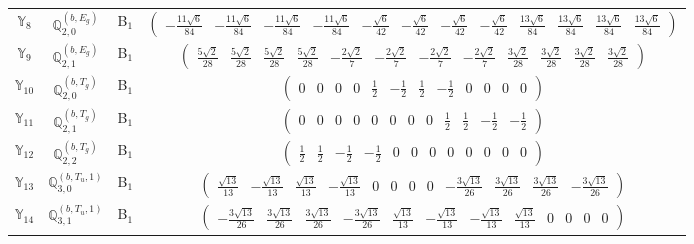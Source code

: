\documentclass[fleqn,10pt,landscape]{article}
\begin{document}
\begin{itemize}
\begin{center}
\begin{longtable}{c|c|c|c}
$ \mathbb{Y}_{8} $ & $\mathbb{Q}_{2,0}^{(b,E_{g})}$ & B$_{1}$ & $\begin{pmatrix} - \frac{11 \sqrt{6}}{84} & - \frac{11 \sqrt{6}}{84} & - \frac{11 \sqrt{6}}{84} & - \frac{11 \sqrt{6}}{84} & - \frac{\sqrt{6}}{42} & - \frac{\sqrt{6}}{42} & - \frac{\sqrt{6}}{42} & - \frac{\sqrt{6}}{42} & \frac{13 \sqrt{6}}{84} & \frac{13 \sqrt{6}}{84} & \frac{13 \sqrt{6}}{84} & \frac{13 \sqrt{6}}{84} \end{pmatrix}$ \\
$ \mathbb{Y}_{9} $ & $\mathbb{Q}_{2,1}^{(b,E_{g})}$ & B$_{1}$ & $\begin{pmatrix} \frac{5 \sqrt{2}}{28} & \frac{5 \sqrt{2}}{28} & \frac{5 \sqrt{2}}{28} & \frac{5 \sqrt{2}}{28} & - \frac{2 \sqrt{2}}{7} & - \frac{2 \sqrt{2}}{7} & - \frac{2 \sqrt{2}}{7} & - \frac{2 \sqrt{2}}{7} & \frac{3 \sqrt{2}}{28} & \frac{3 \sqrt{2}}{28} & \frac{3 \sqrt{2}}{28} & \frac{3 \sqrt{2}}{28} \end{pmatrix}$ \\
$ \mathbb{Y}_{10} $ & $\mathbb{Q}_{2,0}^{(b,T_{g})}$ & B$_{1}$ & $\begin{pmatrix} 0 & 0 & 0 & 0 & \frac{1}{2} & - \frac{1}{2} & \frac{1}{2} & - \frac{1}{2} & 0 & 0 & 0 & 0 \end{pmatrix}$ \\
$ \mathbb{Y}_{11} $ & $\mathbb{Q}_{2,1}^{(b,T_{g})}$ & B$_{1}$ & $\begin{pmatrix} 0 & 0 & 0 & 0 & 0 & 0 & 0 & 0 & \frac{1}{2} & \frac{1}{2} & - \frac{1}{2} & - \frac{1}{2} \end{pmatrix}$ \\
$ \mathbb{Y}_{12} $ & $\mathbb{Q}_{2,2}^{(b,T_{g})}$ & B$_{1}$ & $\begin{pmatrix} \frac{1}{2} & \frac{1}{2} & - \frac{1}{2} & - \frac{1}{2} & 0 & 0 & 0 & 0 & 0 & 0 & 0 & 0 \end{pmatrix}$ \\
$ \mathbb{Y}_{13} $ & $\mathbb{Q}_{3,0}^{(b,T_{u},1)}$ & B$_{1}$ & $\begin{pmatrix} \frac{\sqrt{13}}{13} & - \frac{\sqrt{13}}{13} & \frac{\sqrt{13}}{13} & - \frac{\sqrt{13}}{13} & 0 & 0 & 0 & 0 & - \frac{3 \sqrt{13}}{26} & \frac{3 \sqrt{13}}{26} & \frac{3 \sqrt{13}}{26} & - \frac{3 \sqrt{13}}{26} \end{pmatrix}$ \\
$ \mathbb{Y}_{14} $ & $\mathbb{Q}_{3,1}^{(b,T_{u},1)}$ & B$_{1}$ & $\begin{pmatrix} - \frac{3 \sqrt{13}}{26} & \frac{3 \sqrt{13}}{26} & \frac{3 \sqrt{13}}{26} & - \frac{3 \sqrt{13}}{26} & \frac{\sqrt{13}}{13} & - \frac{\sqrt{13}}{13} & - \frac{\sqrt{13}}{13} & \frac{\sqrt{13}}{13} & 0 & 0 & 0 & 0 \end{pmatrix}$ \\

\end{longtable}
\end{center}
\end{itemize}
\end{document}
